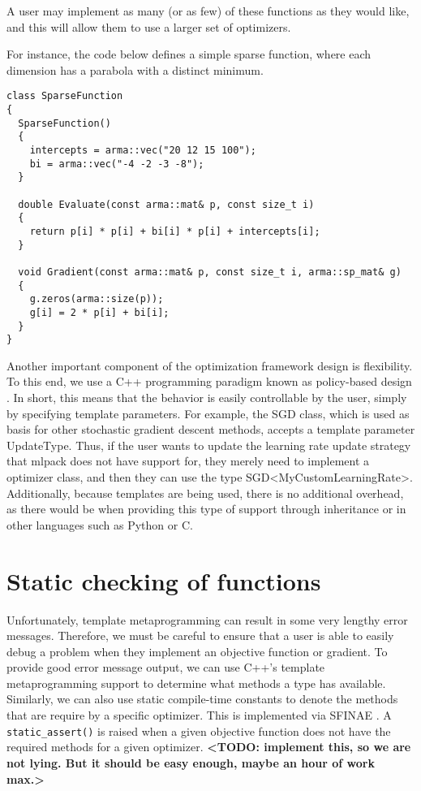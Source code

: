 \documentclass{article}
\begin{document}
A user may implement as many (or as few) of these functions as they would like,
and this will allow them to use a larger set of optimizers.

{\bf <TODO: add very simple example function>}


For instance, the code below defines a simple sparse function, where each
dimension has a parabola with a distinct minimum.

\begin{verbatim}
class SparseFunction
{
  SparseFunction()
  {
    intercepts = arma::vec("20 12 15 100");
    bi = arma::vec("-4 -2 -3 -8");
  }

  double Evaluate(const arma::mat& p, const size_t i)
  {
    return p[i] * p[i] + bi[i] * p[i] + intercepts[i];
  }

  void Gradient(const arma::mat& p, const size_t i, arma::sp_mat& g)
  {
    g.zeros(arma::size(p));
    g[i] = 2 * p[i] + bi[i];
  }
}
\end{verbatim}

Another important component of the optimization framework design is flexibility.
To this end, we use a C++ programming paradigm known as policy-based design
\cite{Alexandrescu2001}. In short, this means that the behavior is easily
controllable by the user, simply by specifying template parameters. For example,
the SGD class, which is used as basis for other stochastic gradient descent
methods, accepts a template parameter UpdateType. Thus, if the user wants to
update the learning rate update strategy that mlpack does not have support for,
they merely need to implement a optimizer class, and then they can use the type
SGD<MyCustomLearningRate>. Additionally, because templates are being used, there
is no additional overhead, as there would be when providing this type of support
through inheritance or in other languages such as Python or C.

\section{Static checking of functions}

{\bf <TODO: probably a better section title>}

Unfortunately, template metaprogramming can result in some very lengthy error
messages.  Therefore, we must be careful to ensure that a user is able to easily
debug a problem when they implement an objective function or gradient.  To
provide good error message output, we can use C++'s template metaprogramming
support to determine what methods a type has available.  Similarly, we can also
use static compile-time constants to denote the methods that are require by a
specific optimizer.  This is implemented via SFINAE \cite{sfinae}.  A {\tt
static\_assert()} is raised when a given objective function does not have the
required methods for a given optimizer.  {\bf <TODO: implement this, so we are
not lying.  But it should be easy enough, maybe an hour of work max.>}
\end{document}
